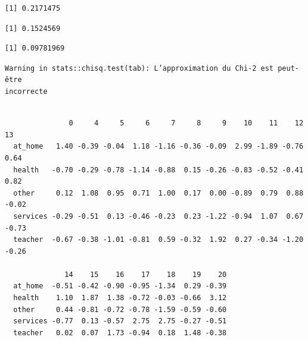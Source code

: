 \documentclass[
  letterpaper,
  DIV=11,
  numbers=noendperiod]{scrartcl}
\newenvironment{Shaded}{\begin{snugshade}}{\end{snugshade}}
\newcommand{\FunctionTok}[1]{\textcolor[rgb]{0.28,0.35,0.67}{#1}}
\newcommand{\NormalTok}[1]{\textcolor[rgb]{0.00,0.23,0.31}{#1}}
\newcommand{\SpecialCharTok}[1]{\textcolor[rgb]{0.37,0.37,0.37}{#1}}
\begin{document}
\begin{Shaded}
\end{Shaded}

\begin{verbatim}
[1] 0.2171475
\end{verbatim}

\begin{Shaded}
\end{Shaded}

\begin{verbatim}
[1] 0.1524569
\end{verbatim}

\begin{Shaded}
\end{Shaded}

\begin{verbatim}
[1] 0.09781969
\end{verbatim}

\begin{Shaded}
\end{Shaded}

\begin{verbatim}
Warning in stats::chisq.test(tab): L’approximation du Chi-2 est peut-être
incorrecte
\end{verbatim}

\begin{verbatim}
          
               0     4     5     6     7     8     9    10    11    12    13
  at_home   1.40 -0.39 -0.04  1.18 -1.16 -0.36 -0.09  2.99 -1.89 -0.76  0.64
  health   -0.70 -0.29 -0.78 -1.14 -0.88  0.15 -0.26 -0.83 -0.52 -0.41  0.82
  other     0.12  1.08  0.95  0.71  1.00  0.17  0.00 -0.89  0.79  0.88 -0.02
  services -0.29 -0.51  0.13 -0.46 -0.23  0.23 -1.22 -0.94  1.07  0.67 -0.73
  teacher  -0.67 -0.38 -1.01 -0.81  0.59 -0.32  1.92  0.27 -0.34 -1.20 -0.26
          
              14    15    16    17    18    19    20
  at_home  -0.51 -0.42 -0.90 -0.95 -1.34  0.29 -0.39
  health    1.10  1.87  1.38 -0.72 -0.03 -0.66  3.12
  other     0.44 -0.81 -0.72 -0.78 -1.59 -0.59 -0.60
  services -0.77  0.13 -0.57  2.75  2.75 -0.27 -0.51
  teacher   0.02  0.07  1.73 -0.94  0.18  1.48 -0.38
\end{verbatim}
\end{document}
